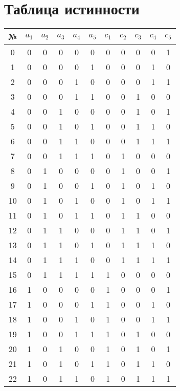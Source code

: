 \documentclass{article}
\begin{document}
\section*{Таблица истинности}
\begin{center}\begin{tabular}{|c|ccccc|ccccc|}
    \hline № & $a_1$ & $a_2$ & $a_3$ & $a_4$ & $a_5$ & $c_1$ & $c_2$ & $c_3$ & $c_4$ & $c_5$ \\ \hline
    0 & 0 & 0 & 0 & 0 & 0 & 0 & 0 & 0 & 0 & 1 \\ \hline
    1 & 0 & 0 & 0 & 0 & 1 & 0 & 0 & 0 & 1 & 0 \\ \hline
    2 & 0 & 0 & 0 & 1 & 0 & 0 & 0 & 0 & 1 & 1 \\ \hline
    3 & 0 & 0 & 0 & 1 & 1 & 0 & 0 & 1 & 0 & 0 \\ \hline
    4 & 0 & 0 & 1 & 0 & 0 & 0 & 0 & 1 & 0 & 1 \\ \hline
    5 & 0 & 0 & 1 & 0 & 1 & 0 & 0 & 1 & 1 & 0 \\ \hline
    6 & 0 & 0 & 1 & 1 & 0 & 0 & 0 & 1 & 1 & 1 \\ \hline
    7 & 0 & 0 & 1 & 1 & 1 & 0 & 1 & 0 & 0 & 0 \\ \hline
    8 & 0 & 1 & 0 & 0 & 0 & 0 & 1 & 0 & 0 & 1 \\ \hline
    9 & 0 & 1 & 0 & 0 & 1 & 0 & 1 & 0 & 1 & 0 \\ \hline
    10 & 0 & 1 & 0 & 1 & 0 & 0 & 1 & 0 & 1 & 1 \\ \hline
    11 & 0 & 1 & 0 & 1 & 1 & 0 & 1 & 1 & 0 & 0 \\ \hline
    12 & 0 & 1 & 1 & 0 & 0 & 0 & 1 & 1 & 0 & 1 \\ \hline
    13 & 0 & 1 & 1 & 0 & 1 & 0 & 1 & 1 & 1 & 0 \\ \hline
    14 & 0 & 1 & 1 & 1 & 0 & 0 & 1 & 1 & 1 & 1 \\ \hline
    15 & 0 & 1 & 1 & 1 & 1 & 1 & 0 & 0 & 0 & 0 \\ \hline
    16 & 1 & 0 & 0 & 0 & 0 & 1 & 0 & 0 & 0 & 1 \\ \hline
    17 & 1 & 0 & 0 & 0 & 1 & 1 & 0 & 0 & 1 & 0 \\ \hline
    18 & 1 & 0 & 0 & 1 & 0 & 1 & 0 & 0 & 1 & 1 \\ \hline
    19 & 1 & 0 & 0 & 1 & 1 & 1 & 0 & 1 & 0 & 0 \\ \hline
    20 & 1 & 0 & 1 & 0 & 0 & 1 & 0 & 1 & 0 & 1 \\ \hline
    21 & 1 & 0 & 1 & 0 & 1 & 1 & 0 & 1 & 1 & 0 \\ \hline
    22 & 1 & 0 & 1 & 1 & 0 & 1 & 0 & 1 & 1 & 1 \\ \hline

\end{tabular}
\end{center}
\end{document}
